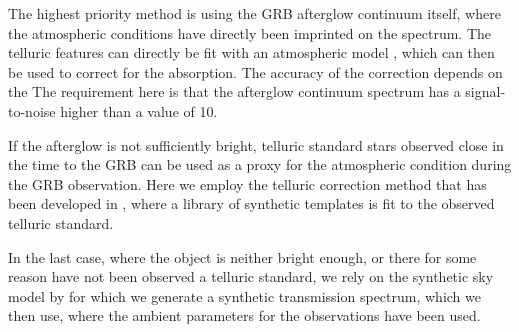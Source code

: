 \documentclass{aa}    %
\begin{document}
The highest priority method is using the GRB afterglow continuum itself, where
the atmospheric conditions have directly been imprinted on the spectrum. The
telluric features can directly be fit with an atmospheric model
\citep{Smette2015, Kausch2015}, which can then be used to correct for the absorption. The accuracy of the correction depends on the 
The requirement here is that the afterglow continuum spectrum has a
signal-to-noise higher than a value of 10.

If the afterglow is not sufficiently bright, telluric standard stars observed
close in the time to the GRB can be used as a proxy for the atmospheric
condition during the GRB observation. Here we employ the telluric correction
method that has been developed in \citet{Selsing2015}, where a library of
synthetic templates is fit to the observed telluric standard.

In the last case, where the object is neither bright enough, or there for some
reason have not been observed a telluric standard, we rely on the synthetic sky
model by \citep{Noll2012, Jones2013} for which we generate a synthetic
transmission spectrum, which we then use, where the ambient parameters for the
observations have been used.
\end{document}
